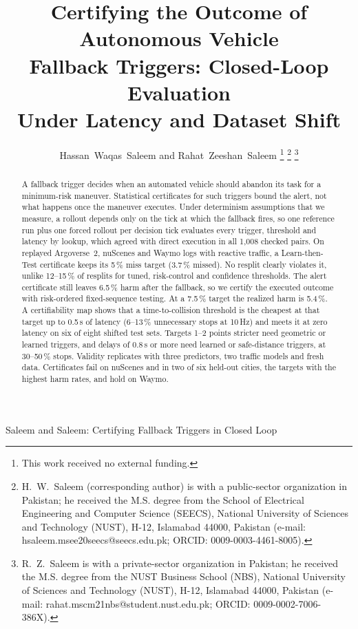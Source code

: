\documentclass[lettersize,journal]{IEEEtran}
\begin{document}
\title{Certifying the Outcome of Autonomous Vehicle\\
Fallback Triggers: Closed-Loop Evaluation\\
Under Latency and Dataset Shift}

\author{Hassan~Waqas~Saleem and Rahat~Zeeshan~Saleem
\thanks{This work received no external funding.}%
\thanks{H.~W.~Saleem (corresponding author) is with a public-sector
organization in Pakistan; he received the M.S. degree from the School of
Electrical Engineering and Computer Science (SEECS), National University
of Sciences and Technology (NUST), H-12, Islamabad 44000, Pakistan (e-mail:
hsaleem.msee20seecs@seecs.edu.pk; ORCID: 0009-0003-4461-8005).}%
\thanks{R.~Z.~Saleem is with a private-sector organization in Pakistan;
he received the M.S. degree from the NUST Business School (NBS),
National University of Sciences and Technology (NUST), H-12, Islamabad
44000, Pakistan (e-mail: rahat.mscm21nbs@student.nust.edu.pk; ORCID: 0009-0002-7006-386X).}}

%
{Saleem and Saleem: Certifying Fallback Triggers in Closed Loop}

\maketitle

\begin{abstract}
A fallback trigger decides when an automated vehicle should abandon its
task for a minimum-risk maneuver. Statistical certificates for such
triggers bound the alert, not what happens once the maneuver executes. Under
determinism assumptions that we measure, a rollout depends only on the tick
at which the fallback fires, so one reference run plus one forced rollout
per decision tick evaluates every trigger, threshold and latency by lookup,
which agreed with direct execution in all 1{,}008 checked pairs. On replayed
Argoverse~2, nuScenes and Waymo logs with reactive traffic, a Learn-then-Test
certificate keeps its 5\,\% miss target (3.7\,\% missed). No resplit clearly
violates it, unlike 12--15\,\% of resplits for tuned, risk-control and
confidence thresholds. The alert certificate still leaves 6.5\,\% harm after
the fallback, so we certify the executed outcome with risk-ordered
fixed-sequence testing. At a 7.5\,\% target the realized harm is 5.4\,\%. A
certifiability map shows that a time-to-collision threshold is the
cheapest at that target up to 0.5\,s of latency (6--13\,\% unnecessary stops
at 10\,Hz) and meets it at zero latency on six of eight shifted test sets.
Targets 1--2 points stricter need geometric or learned triggers, and delays of
0.8\,s or more need learned or safe-distance triggers, at 30--50\,\% stops.
Validity replicates with three predictors, two traffic models and fresh data.
Certificates fail on nuScenes and in two of six held-out cities, the targets
with the highest harm rates, and hold on Waymo.
\end{abstract}
\end{document}
